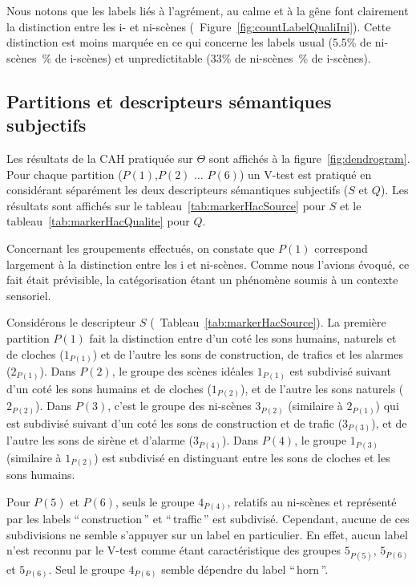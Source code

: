 Nous notons que les labels liés à l'agrément, au calme et à la gêne font clairement la distinction entre les i- et ni-scènes (\cf~Figure~\ref{fig:countLabelQualiIni}). Cette distinction est moins marquée en ce qui concerne les labels usual (5.5\% de ni-scènes~\% de i-scènes) et unpredictitable (33\% de ni-scènes~\% de i-scènes).

\subsection{Partitions et descripteurs sémantiques subjectifs}

Les résultats de la CAH pratiquée sur $\Theta$ sont affichés à la figure~\ref{fig:dendrogram}. Pour chaque partition ($P(1)$,$P(2)$ $\ldots$ $P(6)$) un V-test est pratiqué en considérant séparément les deux descripteurs sémantiques subjectifs ($S$ et $Q$). Les résultats sont affichés sur le tableau~\ref{tab:markerHacSource} pour $S$ et le tableau~\ref{tab:markerHacQualite} pour $Q$.

Concernant les groupements effectués, on constate que $P(1)$ correspond largement à la distinction entre les i et ni-scènes. Comme nous l'avions évoqué, ce fait était prévisible, la catégorisation étant un phénomène soumis à un contexte sensoriel.

Considérons le descripteur $S$ (\cf~Tableau~\ref{tab:markerHacSource}). La première partition $P(1)$ fait la distinction entre d'un coté les sons humains, naturels et de cloches ($1_{P(1)}$) et de l'autre les sons de construction, de trafics et les alarmes ($2_{P(1)}$). Dans $P(2)$, le groupe des scènes idéales $1_{P(1)}$ est subdivisé suivant d'un coté les sons humains et de cloches ($1_{P(2)}$), et de l'autre les sons naturels ($2_{P(2)}$).  Dans $P(3)$, c'est le groupe des ni-scènes $3_{P(2)}$ (similaire à $2_{P(1)}$) qui est subdivisé suivant d'un coté les sons de construction et de trafic ($3_{P(3)}$), et de l'autre les sons de sirène et d'alarme ($3_{P(4)}$). Dans $P(4)$, le groupe $1_{P(3)}$ (similaire à $1_{P(2)}$) est subdivisé en distinguant entre les sons de cloches et les sons humains.

Pour $P(5)$ et $P(6)$, seuls le groupe $4_{P(4)}$, relatifs au ni-scènes et représenté par les labels ``\,construction\,'' et ``\,traffic\,'' est subdivisé. Cependant, aucune de ces subdivisions ne semble s'appuyer sur un label en particulier. En effet, aucun label n'est reconnu par le V-test comme étant caractéristique des groupes $5_{P(5)}$, $5_{P(6)}$ et $5_{P(6)}$. Seul le groupe $4_{P(6)}$ semble dépendre du label ``\,horn\,''. 

